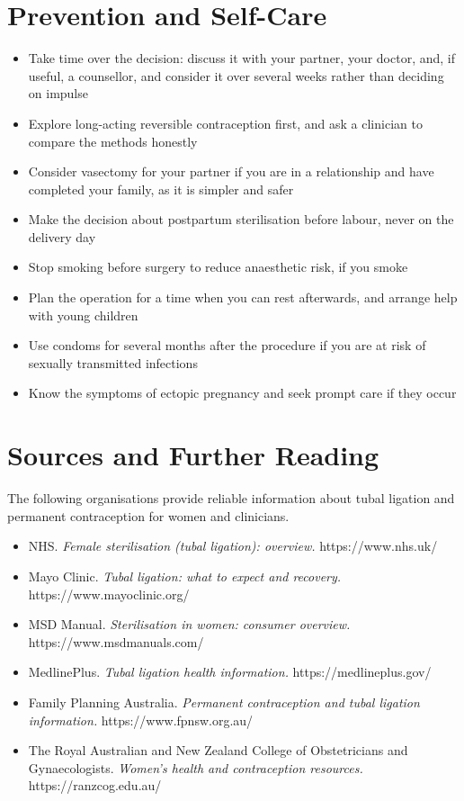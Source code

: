 \section*{Prevention and Self-Care}
\begin{itemize}
    \item Take time over the decision: discuss it with your partner, your doctor, and, if useful, a counsellor, and consider it over several weeks rather than deciding on impulse
    \item Explore long-acting reversible contraception first, and ask a clinician to compare the methods honestly
    \item Consider vasectomy for your partner if you are in a relationship and have completed your family, as it is simpler and safer
    \item Make the decision about postpartum sterilisation before labour, never on the delivery day
    \item Stop smoking before surgery to reduce anaesthetic risk, if you smoke
    \item Plan the operation for a time when you can rest afterwards, and arrange help with young children
    \item Use condoms for several months after the procedure if you are at risk of sexually transmitted infections
    \item Know the symptoms of ectopic pregnancy and seek prompt care if they occur
\end{itemize}

\section*{Sources and Further Reading}
The following organisations provide reliable information about tubal ligation and permanent contraception for women and clinicians.

\begin{itemize}
    \item NHS. \textit{Female sterilisation (tubal ligation): overview.} https://www.nhs.uk/
    \item Mayo Clinic. \textit{Tubal ligation: what to expect and recovery.} https://www.mayoclinic.org/
    \item MSD Manual. \textit{Sterilisation in women: consumer overview.} https://www.msdmanuals.com/
    \item MedlinePlus. \textit{Tubal ligation health information.} https://medlineplus.gov/
    \item Family Planning Australia. \textit{Permanent contraception and tubal ligation information.} https://www.fpnsw.org.au/
    \item The Royal Australian and New Zealand College of Obstetricians and Gynaecologists. \textit{Women's health and contraception resources.} https://ranzcog.edu.au/
\end{itemize}
